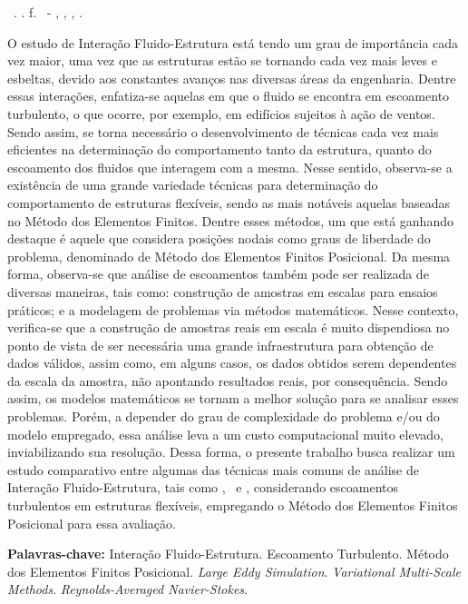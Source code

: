 \setlength{\absparsep}{18pt} %
\begin{resumo}
  \begin{flushleft}
    \setlength{\absparsep}{0pt} %
    \SingleSpacing
    \Autorabr\ \textbf{\Titulo}.	\the\year. \pageref{LastPage}f.
    \Tipotrabalho\ - \Unidademin, \Universidade, \Local, \the\year.
  \end{flushleft}
  \OnehalfSpacing

  O estudo de Interação Fluido-Estrutura está tendo um grau de importância cada vez maior, uma vez que as estruturas estão se tornando cada vez mais leves e esbeltas, devido aos constantes avanços nas diversas áreas da engenharia. Dentre essas interações, enfatiza-se aquelas em que o fluido se encontra em escoamento turbulento, o que ocorre, por exemplo, em edifícios sujeitos à ação de ventos. Sendo assim, se torna necessário o desenvolvimento de técnicas cada vez mais eficientes na determinação do comportamento tanto da estrutura, quanto do escoamento dos fluidos que interagem com a mesma. Nesse sentido, observa-se a existência de uma grande variedade técnicas para determinação do comportamento de estruturas flexíveis, sendo as mais notáveis aquelas baseadas no Método dos Elementos Finitos. Dentre esses métodos, um que está ganhando destaque é aquele que considera posições nodais como graus de liberdade do problema, denominado de Método dos Elementos Finitos Posicional. Da mesma forma, observa-se que análise de escoamentos também pode ser realizada de diversas maneiras, tais como: construção de amostras em escalas para ensaios práticos; e a modelagem de problemas via métodos matemáticos. Nesse contexto, verifica-se que a construção de amostras reais em escala é muito dispendiosa no ponto de vista de ser necessária uma grande infraestrutura para obtenção de dados válidos, assim como, em alguns casos, os dados obtidos serem dependentes da escala da amostra, não apontando resultados reais, por consequência. Sendo assim, os modelos matemáticos se tornam a melhor solução para se analisar esses problemas. Porém, a depender do grau de complexidade do problema e/ou do modelo empregado, essa análise leva a um custo computacional muito elevado, inviabilizando sua resolução. Dessa forma, o presente trabalho busca realizar um estudo comparativo entre algumas das técnicas mais comuns de análise de Interação Fluido-Estrutura, tais como \RANS, \LES\ e \VMS, considerando escoamentos turbulentos em estruturas flexíveis, empregando o Método dos Elementos Finitos Posicional para essa avaliação.

  \textbf{Palavras-chave:} Interação Fluido-Estrutura. Escoamento Turbulento. Método dos Elementos Finitos Posicional. \textit{Large Eddy Simulation}. \textit{Variational Multi-Scale Methods}. \textit{Reynolds-Averaged Navier-Stokes}.
\end{resumo}

